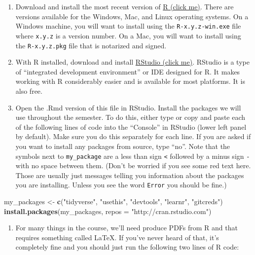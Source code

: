 \documentclass[
  11pt,
  letterpaper]{article}
\newenvironment{Shaded}{\begin{snugshade}}{\end{snugshade}}
\newcommand{\AttributeTok}[1]{\textcolor[rgb]{0.13,0.29,0.53}{#1}}
\newcommand{\FunctionTok}[1]{\textcolor[rgb]{0.13,0.29,0.53}{\textbf{#1}}}
\newcommand{\NormalTok}[1]{#1}
\newcommand{\OtherTok}[1]{\textcolor[rgb]{0.56,0.35,0.01}{#1}}
\newcommand{\StringTok}[1]{\textcolor[rgb]{0.31,0.60,0.02}{#1}}
\providecommand{\tightlist}{%
  \setlength{\itemsep}{0pt}\setlength{\parskip}{0pt}}
\begin{document}
\begin{enumerate}
\def\labelenumi{\arabic{enumi}.}
\item
  Download and install the most recent version of
  \href{https://cloud.r-project.org/}{R (click me)}. There are versions
  available for the Windows, Mac, and Linux operating systems. On a
  Windows machine, you will want to install using the
  \texttt{R-x.y.z-win.exe} file where \texttt{x.y.z} is a version
  number. On a Mac, you will want to install using the
  \texttt{R-x.y.z.pkg} file that is notarized and signed.
\item
  With R installed, download and install
  \href{https://posit.co/download/rstudio-desktop/}{RStudio (click me)}.
  RStudio is a type of ``integrated development environment'' or IDE
  designed for R. It makes working with R considerably easier and is
  available for most platforms. It is also free.
\item
  Open the .Rmd version of this file in RStudio. Install the packages we
  will use throughout the semester. To do this, either type or copy and
  paste each of the following lines of code into the ``Console'' in
  RStudio (lower left panel by default). Make sure you do this
  separately for each line. If you are asked if you want to install any
  packages from source, type ``no''. Note that the symbols next to
  \texttt{my\_package} are a less than sign \texttt{\textless{}}
  followed by a minus sign \texttt{-} with no space between them. (Don't
  be worried if you see some red text here. Those are usually just
  messages telling you information about the packages you are
  installing. Unless you see the word \texttt{Error} you should be
  fine.)
\end{enumerate}

\begin{Shaded}
\begin{Highlighting}[]
\NormalTok{my\_packages }\OtherTok{\textless{}{-}} \FunctionTok{c}\NormalTok{(}\StringTok{"tidyverse"}\NormalTok{, }\StringTok{"usethis"}\NormalTok{, }\StringTok{"devtools"}\NormalTok{, }\StringTok{"learnr"}\NormalTok{,}
                 \StringTok{"gitcreds"}\NormalTok{)}
\FunctionTok{install.packages}\NormalTok{(my\_packages, }\AttributeTok{repos =} \StringTok{"http://cran.rstudio.com"}\NormalTok{)}
\end{Highlighting}
\end{Shaded}

\begin{enumerate}
\def\labelenumi{\arabic{enumi}.}
\setcounter{enumi}{3}
\tightlist
\item
  For many things in the course, we'll need produce PDFs from R and that
  requires something called LaTeX. If you've never heard of that, it's
  completely fine and you should just run the following two lines of R
  code:
\end{enumerate}
\end{document}
